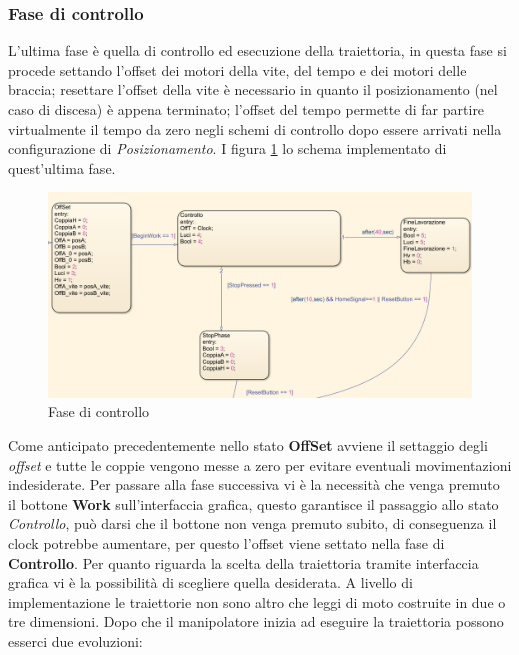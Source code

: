 \subsubsection{Fase di controllo}
L'ultima fase è quella di controllo ed esecuzione della traiettoria, in questa fase si procede settando l'offset dei motori della vite, del tempo e dei motori delle braccia; resettare l'offset della vite è necessario in quanto il posizionamento (nel caso di discesa) è appena terminato; l'offset del tempo permette di far partire virtualmente il tempo da zero negli schemi di controllo dopo essere arrivati nella configurazione di \textit{Posizionamento}. I figura \ref{fig:Traiettoria} lo schema implementato di quest'ultima fase.
\begin{figure}[ht]
\begin{center}
    \includegraphics[scale=0.6]{Immagini/Sperimentale/state3New.png}
    \caption{Fase di controllo}
    \label{fig:Traiettoria}
\end{center}
\end{figure}
\par Come anticipato precedentemente nello stato \textbf{OffSet} avviene il settaggio degli \textit{offset} e tutte le coppie vengono messe a zero per evitare eventuali movimentazioni indesiderate. Per passare alla fase successiva vi è la necessità che venga premuto il bottone \textbf{Work} sull'interfaccia grafica, questo garantisce il passaggio allo stato \textit{Controllo}, può darsi che il bottone non venga premuto subito, di conseguenza il clock potrebbe aumentare, per questo l'offset viene settato nella fase di \textbf{Controllo}. Per quanto riguarda la scelta della traiettoria tramite interfaccia grafica vi è la possibilità di scegliere quella desiderata. A livello di implementazione le traiettorie non sono altro che leggi di moto costruite in due o tre dimensioni. Dopo che il manipolatore inizia ad eseguire la traiettoria possono esserci due evoluzioni:
